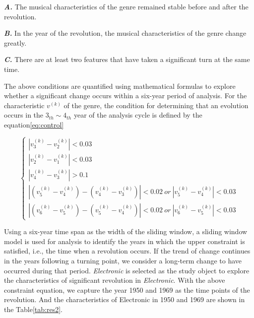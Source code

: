 \documentclass[12pt]{article}  %
\newenvironment{shrinkeq}[1]
{ \bgroup
	\addtolength\abovedisplayshortskip{#1}
	\addtolength\abovedisplayskip{#1}
	\addtolength\belowdisplayshortskip{#1}
	\addtolength\belowdisplayskip{#1}}
{\egroup\ignorespacesafterend}
\begin{document}
\textbf{\emph{A.}} The musical characteristics of the genre remained stable before and after the revolution.

\textbf{\emph{B.}} In the year of the revolution, the musical characteristics of the genre change greatly.

\textbf{\emph{C.}}  There are at least two features that have taken a significant turn at the same time.

The above conditions are quantified using mathematical formulas to explore whether a significant change occurs within a six-year period of analysis. For the characteristic $v^{(k)}$ of the genre, the condition for determining that an evolution occurs in the $3_{th}\sim4_{th}$ year of the analysis cycle is defined by the equation\eqref{eq:control}

\begin{shrinkeq}{-1.5ex}
	\begin{equation}\label{eq:control}
		\begin{cases}
		|v_3^{(k)}-v_2^{(k)}|<0.03\\
		|v_2^{(k)}-v_1^{(k)}|<0.03\\
		|v_4^{(k)}-v_3^{(k)}|>0.1\\
		|(v_5^{(k)}-v_4^{(k)})-(v_4^{(k)}-v_3^{(k)})|<0.02\ or\ |v_5^{(k)}-v_4^{(k)}|<0.03\\
		|(v_6^{(k)}-v_5^{(k)})-(v_5^{(k)}-v_4^{(k)})|<0.02\ or\ |v_6^{(k)}-v_5^{(k)}|<0.03
		\end{cases}
	\end{equation}
\end{shrinkeq}

Using a six-year time span as the width of the sliding window, a sliding window model is used for analysis to identify the years in which the upper constraint is satisfied, i.e., the time when a revolution occurs. If the trend of change continues in the years following a turning point, we consider a long-term change to have occurred during that period. \emph{Electronic} is selected as the study object to explore the characteristics of significant revolution in \emph{Electronic}. With the above constraint equation, we capture the year 1950 and 1969 as the time points of the revolution. And the characteristics of Electronic in 1950 and 1969 are shown in the Table\eqref{tab:res2}.
\end{document}
